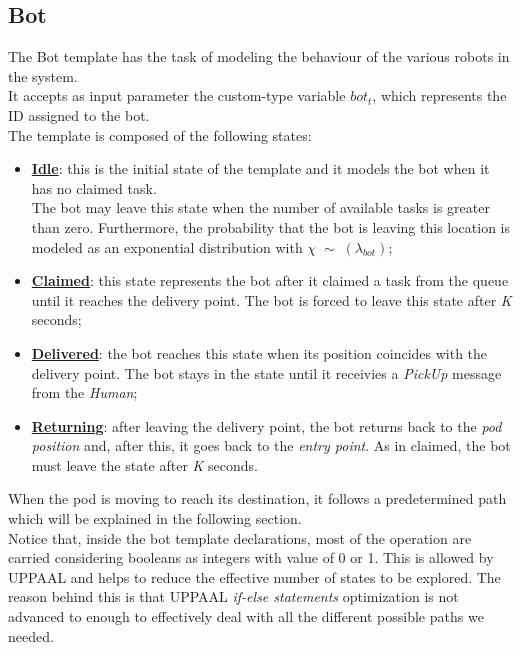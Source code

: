 \documentclass{article}
\begin{document}
		
		\subsection{Bot}
			The Bot template has the task of modeling the behaviour of the various robots in the system. \\
			It accepts as input parameter the custom-type variable $bot_t$, which represents the ID assigned to the bot.\\
			The template is composed of the following states:
			\begin{itemize}
				\item \textbf{\underline{Idle}}: this is the initial state of the template and it models the bot when it has no claimed task.\\The bot may leave this state when the number of available tasks is greater than zero. Furthermore, the probability that the bot is leaving this location is modeled as an exponential distribution with $\chi\;\sim\;(\lambda_{bot})$;
				\item \textbf{\underline{Claimed}}: this state represents the bot after it claimed a task from the queue until it reaches the delivery point. The bot is forced to leave this state after \emph{K} seconds;
				\item \textbf{\underline{Delivered}}: the bot reaches this state when its position coincides with the delivery point. The bot stays in the state until it receivies a \emph{PickUp} message from the \emph{Human};
				\item \textbf{\underline{Returning}}: after leaving the delivery point, the bot returns back to the \emph{pod position} and, after this, it goes back to the \emph{entry point}. As in claimed, the bot must leave the state after \emph{K} seconds.
			\end{itemize}
			When the pod is moving to reach its destination, it follows a predetermined path which will be explained in the following section.\\
			Notice that, inside the bot template declarations, most of the operation are carried considering booleans as integers with value of 0 or 1. This is allowed by UPPAAL and helps to reduce the effective number of states to be explored. The reason behind this is that UPPAAL \emph{if-else statements} optimization is not advanced to enough to effectively deal with all the different possible paths we needed. 
			
\end{document}

